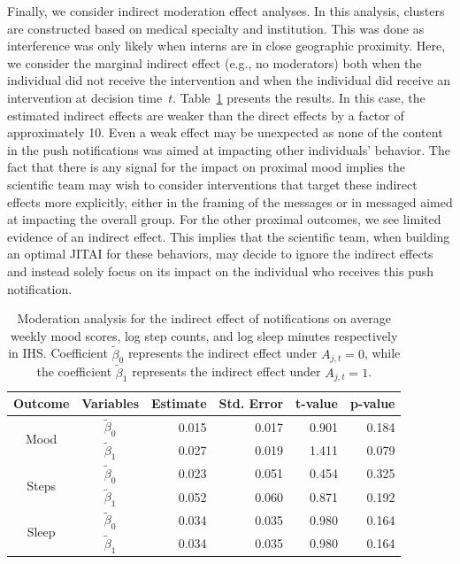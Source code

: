 \documentclass[12pt]{article}
\begin{document}
Finally, we consider indirect moderation effect analyses.   In this analysis, clusters are constructed based on medical specialty and institution.  This was done as interference was only likely when interns are in close geographic proximity.   Here, we consider the marginal indirect effect (e.g., no moderators) both when the individual did not receive the intervention and when the individual did receive an intervention at decision time~$t$.  Table~\ref{tab:IHS_indirect} presents the results.  In this case, the estimated indirect effects are weaker than the direct effects by a factor of approximately 10.  Even a weak effect may be unexpected as none of the content in the push notifications was aimed at impacting other individuals' behavior. The fact that there is any signal for the impact on proximal mood implies the scientific team may wish to consider interventions that target these indirect effects more explicitly, either in the framing of the messages or in messaged aimed at impacting the overall group. For the other proximal outcomes, we see limited evidence of an indirect effect.  This implies that the scientific team, when building an optimal JITAI for these behaviors, may decide to ignore the indirect effects and instead solely focus on its impact on the individual who receives this push notification.

\begin{table}[!th]
\centering
\begin{tabular}{c | crrrr}
\hline
Outcome & Variables & Estimate & Std. Error & t-value & p-value \\ \hline
\multirow{2}{*}{Mood} & $\tilde \beta_0$ & 0.015 & 0.017 & 0.901 & 0.184 \\
& $\tilde \beta_1$ & 0.027 & 0.019 & 1.411 & 0.079 \\ \hline
\multirow{2}{*}{Steps} & $\tilde \beta_0$ & 0.023 & 0.051 & 0.454 & 0.325\\
& $\tilde \beta_1$ & 0.052 & 0.060 & 0.871 & 0.192 \\ \hline
\multirow{2}{*}{Sleep} & $\tilde \beta_0$ & 0.034 & 0.035 & 0.980 & 0.164\\
& $\tilde \beta_1$ & 0.034 & 0.035 & 0.980 & 0.164\\ \hline
\end{tabular}
\caption{Moderation analysis for the indirect effect of notifications on average weekly mood scores, log step counts, and log sleep minutes respectively in IHS.  Coefficient $\tilde \beta_0$ represents the indirect effect under $A_{j,t} = 0$, while the coefficient $\tilde \beta_1$ represents the indirect effect under $A_{j,t} = 1$.}
\label{tab:IHS_indirect}
\end{table}
\end{document}

